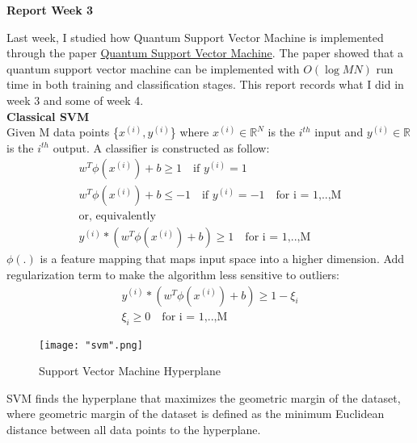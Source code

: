 \documentclass[11pt]{article}
\begin{document}
\begin{center}
\textbf{\Large Report Week 3}
\end{center}

Last week, I studied how Quantum Support Vector Machine is implemented through the paper \href{https://arxiv.org/abs/1307.0471?context=cs}{Quantum Support Vector Machine}.  The paper showed that a quantum support vector machine can be implemented with $O(\log MN)$ run time in both training and classification stages.  This report records what I did in week 3 and some of week 4. \\

\textbf{\large Classical SVM} \\

Given M data points \{$x^{(i)}, y^{(i)}$\} where $x^{(i)} \in \mathbb{R}^{N}$ is the $i^{th}$ input and $y^{(i)} \in \mathbb{R}$ is the $i^{th}$ output. A classifier is constructed as follow:
\begin{equation}
\label{eq:t}
\begin{gathered}
w^{T} \phi(x^{(i)}) + b \geq 1 \quad \text{if } y^{(i)} = 1 \\
w^{T} \phi(x^{(i)}) + b \leq -1 \quad \text{if } y^{(i)} = -1  \quad \text{for i = 1,..,M} \\
\text{or, equivalently} \\
y^{(i)}*(w^{T} \phi(x^{(i)}) + b) \geq 1 \quad \text{for i = 1,..,M} 
\end{gathered}
\end{equation}
$\phi(.)$ is a feature mapping that maps input space into a higher dimension. Add regularization term to make the algorithm less sensitive to outliers: 
\begin{equation}
\label{eq:t}
\begin{gathered}
y^{(i)}*(w^{T} \phi(x^{(i)}) + b) \geq 1 - \xi_{i}  \\
\xi_{i} \geq 0 \quad \text{for i = 1,..,M}
\end{gathered}
\end{equation}

\begin{figure}[h]
    \centering
    \texttt{[image: "svm".png]}
    \caption{Support Vector Machine Hyperplane}
    \label{fig: SVM}
\end{figure}

SVM finds the hyperplane that maximizes the geometric margin of the dataset, where geometric margin of the dataset is defined as the minimum Euclidean distance between all data points to the hyperplane. 
\end{document}
